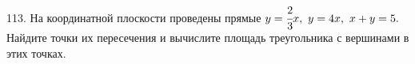 113. На координатной плоскости проведены прямые $y=\cfrac{2}{3}x,\ y=4x,\ x+y=5.$ Найдите точки их пересечения и вычислите площадь треугольника
с вершинами в этих точках.\\
